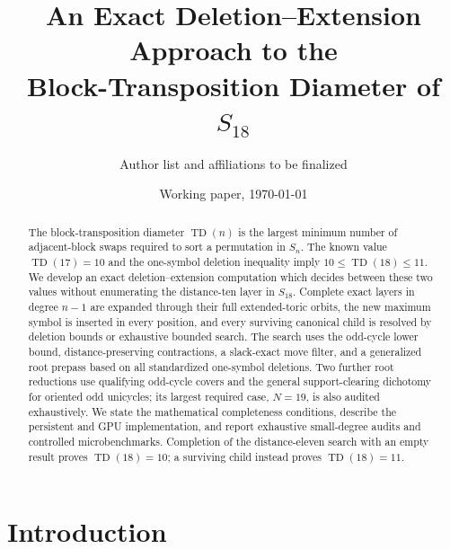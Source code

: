 \documentclass[11pt]{article}
\title{An Exact Deletion--Extension Approach to the\\
  Block-Transposition Diameter of $S_{18}$}
\author{Author list and affiliations to be finalized}
\date{Working paper, \today}
\theoremstyle{definition}
\theoremstyle{remark}
\newcommand{\TD}{\operatorname{TD}}
\newif\ifdraftstatus
\begin{document}
\maketitle

\begin{abstract}
The block-transposition diameter $\TD(n)$ is the largest minimum number of
adjacent-block swaps required to sort a permutation in $S_n$.  The known value
$\TD(17)=10$ and the one-symbol deletion inequality imply
$10\leq\TD(18)\leq11$.  We develop an exact deletion--extension computation
which decides between these two values without enumerating the distance-ten
layer in $S_{18}$.  Complete exact layers in degree $n-1$ are expanded through
their full extended-toric orbits, the new maximum symbol is inserted in every
position, and every surviving canonical child is resolved by deletion bounds
or exhaustive bounded search.  The search uses the odd-cycle lower bound,
distance-preserving contractions, a slack-exact move filter, and a generalized
root prepass based on all standardized one-symbol deletions.  Two further root
reductions use qualifying odd-cycle covers and the general support-clearing
dichotomy for oriented odd unicycles; its largest required case, $N=19$, is
also audited exhaustively.  We state the
mathematical completeness conditions, describe the persistent and GPU
implementation, and report exhaustive small-degree audits and controlled
microbenchmarks.  Completion of the distance-eleven search with an empty
result proves $\TD(18)=10$; a surviving child instead proves
$\TD(18)=11$.
\end{abstract}

\ifdraftstatus
\begin{center}
\fcolorbox{red!60!black}{red!4}{%
  \begin{minipage}{0.91\linewidth}
  \textbf{Computational status.}
  This document is a proof-ready working paper, not yet a claim that
  $\TD(18)=10$ has been established.  The reduction, implementation, audits,
  and benchmark are present; the complete degree-18 run and its archived
  audit artifacts remain pending.  No degree-18 count, running time, hash, or
  empty result is inferred from a partial computation.
  \end{minipage}}
\end{center}
\fi

\section{Introduction}
\end{document}
